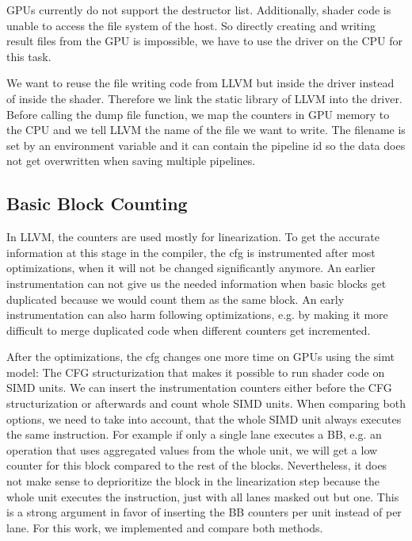 GPUs currently do not support the destructor list. Additionally, shader code is unable to access the file system of the host.
So directly creating and writing result files from the GPU is impossible, we have to use the driver on the CPU for this task.

We want to reuse the file writing code from LLVM but inside the driver instead of inside the shader.
Therefore we link the static library of LLVM into the driver.
Before calling the dump file function, we map the counters in GPU memory to the CPU and we tell LLVM the name of the file we want to write.
The filename is set by an environment variable and it can contain the pipeline id so the data does not get overwritten when saving multiple pipelines.

\subsection{Basic Block Counting}
\label{sub:design_counters}
In LLVM, the counters are used mostly for linearization. To get the accurate information at this stage in the compiler, the \gls{cfg} is instrumented after most optimizations, when it will not be changed significantly anymore.
An earlier instrumentation can not give us the needed information when basic blocks get duplicated because we would count them as the same block. An early instrumentation can also harm following optimizations, e.g. by making it more difficult to merge duplicated code when different counters get incremented.

After the optimizations, the \gls{cfg} changes one more time on GPUs using the \gls{simt} model: The CFG structurization that makes it possible to run shader code on SIMD units.
We can insert the instrumentation counters either before the CFG structurization or afterwards and count whole SIMD units. When comparing both options, we need to take into account, that the whole SIMD unit always executes the same instruction.
For example if only a single lane executes a BB, e.g. an operation that uses aggregated values from the whole unit, we will get a low counter for this block compared to the rest of the blocks. Nevertheless, it does not make sense to deprioritize the block in the linearization step because the whole unit executes the instruction, just with all lanes masked out but one.
This is a strong argument in favor of inserting the BB counters per unit instead of per lane. For this work, we implemented and compare both methods.

